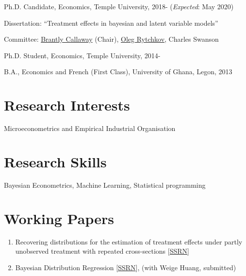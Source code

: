 \documentclass[letterpaper]{article}
\renewenvironment{itemize}{
  \begin{list}{}{
    \setlength{\leftmargin}{1.5em}
  }
}{
  \end{list}
}
\begin{document}
\begin{itemize}
  \item Ph.D. Candidate, Economics, Temple University, 2018- (\textit{Expected}: May 2020)

  \begin{itemize}
    \item Dissertation: ``Treatment effects in bayesian and latent variable
    models''
    \item Committee:   \href{https://bcallaway11.github.io/index.html}
    {Brantly Callaway} (Chair), \href{https://astro.temple.edu/~rytchkov/}{Oleg Rytchkov}, Charles Swanson 
  \end{itemize}

	\item Ph.D. Student, Economics, Temple University, 2014-

  \item B.A., Economics and French (First Class), University of Ghana, Legon, 2013
\end{itemize}

\section*{Research Interests}
\begin{itemize}
  \item Microeconometrics and Empirical Industrial Organisation
\end{itemize}

\section*{Research Skills}
\begin{itemize}
	\item Bayesian Econometrics, Machine Learning, Statistical programming
\end{itemize}

\section*{Working Papers}
\begin{enumerate}
	\item Recovering distributions for the estimation of treatment
	effects under partly unobserved treatment with repeated
	cross-sections  [\href{https://papers.ssrn.com/sol3/papers.cfm?abstract_id=3194286}{SSRN}] 
  	\item Bayesian Distribution Regression [\href{https://papers.ssrn.com/sol3/papers.cfm?abstract_id=3048658}{SSRN}], (with Weige Huang, submitted)
\end{enumerate}
\end{document}
